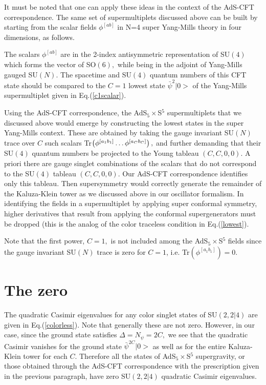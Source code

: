 \documentclass[a4paper,aps,preprint,nofootinbib]{revtex4}
\begin{document}
It must be noted that one can apply these ideas in the context of the
AdS-CFT correspondence. The same set of supermultiplets discussed above can
be built by starting from the scalar fields $\phi^{\left[ ab\right] }$ in
N=4 super Yang-Mills theory in four dimensions, as follows.

The scalars $\phi^{\left[ ab\right] }$ are in the 2-index antisymmetric
representation of SU$\left( 4\right) $ which forms the vector of SO$\left(
6\right) ,$ while being in the adjoint of Yang-Mills gauged SU$\left(
N\right) .$ The spacetime and SU$\left( 4\right) $ quantum numbers of this
CFT state should be compared to the $C=1$ lowest state $\bar{\psi}^{2}|0>$
of the Yang-Mills supermultiplet given in Eq.(\ref{c1scalar}).

Using the AdS-CFT correspondence, the AdS$_{5}\times$S$^{5}$ supermultiplets
that we discussed above would emerge by constructing the lowest states in
the super Yang-Mills context. These are obtained by taking the gauge
invariant SU$\left( N\right) $ trace over $C$ such scalars Tr$\left( \phi^{%
\left[ a_{1}b_{1}\right] }\ldots\phi^{\left[ a_{C}b_{C}\right] }\right) ,$
and further demanding that their SU$\left( 4\right) $ quantum numbers be
projected to the Young tableau $\left( C,C,0,0\right).$ A priori there are
gauge singlet combinations of the scalars that do not correspond to the SU$%
(4)$ tableau $\left( C,C,0,0\right)$. Our AdS-CFT correspondence identifies
only this tableau. Then supersymmetry would correctly generate the remainder
of the Kaluza-Klein tower as we discussed above in our oscillator formalism.
In identifying the fields in a supermultiplet by applying super conformal
symmetry, higher derivatives that result from applying the conformal
supergenerators must be dropped (this is the analog of the color traceless
condition in Eq.(\ref{lowest}).

Note that the first power, $C=1,$ is not included among the AdS$_{5}\times$S$%
^{5}$ fields since the gauge invariant SU$\left( N\right) $ trace is zero
for $C=1$, i.e. Tr$\left( \phi^{\left[ a_{1}b_{1}\right] }\right) =0.$

\section{The zero}

The quadratic Casimir eigenvalues for any color singlet states of SU$\left(
2,2|4\right) $ are given in Eq.(\ref{colorless}). Note that generally these
are not zero. However, in our case, since the ground state satisfies $%
\Delta=N_{\psi}=2C,$ we see that the quadratic Casimir vanishes for the
ground state $\bar{\psi}^{2C}|0>$ as well as for the entire Kaluza-Klein
tower for each $C.$ Therefore all the states of AdS$_{5}\times$S$^{5}$
supergravity, or those obtained through the AdS-CFT correspondence with the
prescription given in the previous paragraph, have zero SU$\left(
2,2|4\right) $ quadratic Casimir eigenvalues.
\end{document}
